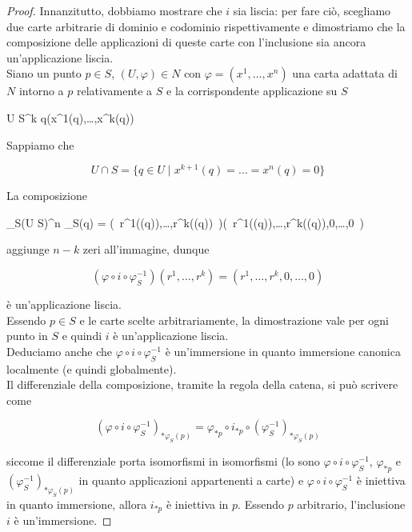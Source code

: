 \begin{proof}
	Innanzitutto, dobbiamo mostrare che $ i $ sia liscia: per fare ciò, scegliamo due carte arbitrarie di dominio e codominio rispettivamente e dimostriamo che la composizione delle applicazioni di queste carte con l'inclusione sia ancora un'applicazione liscia. \\
	Siano un punto $ p \in S $, $ (U,\varphi) \in N $ con $ \varphi = (x^{1},\dots,x^{n}) $ una carta adattata di $ N $ intorno a $ p $ relativamente a $ S $ e la corrispondente applicazione su $ S $
	
		{U \cap S}{\R^{k}}
		{q}{(x^{1}(q),\dots,x^{k}(q))}
	
	Sappiamo che
	
	\begin{equation}
		U \cap S = \{ q \in U \mid x^{k+1}(q) = \dots = x^{n}(q) = 0 \}
	\end{equation}

	La composizione
	
		{\varphi_{S}(U \cap S)}{\R^{n}}
		{\varphi_{S}(q) = (\, r^{1}(\varphi(q)),\dots,r^{k}(\varphi(q)) \,)}{(\, r^{1}(\varphi(q)),\dots,r^{k}(\varphi(q)),0,\dots,0 \,)}
	
	aggiunge $ n-k $ zeri all'immagine, dunque
	
	\begin{equation}
		(\varphi \circ i \circ \varphi_{S}^{-1}) (r^{1},\dots,r^{k}) = (r^{1},\dots,r^{k},0,\dots,0)
	\end{equation}

	è un'applicazione liscia. \\	
	Essendo $ p \in S $ e le carte scelte arbitrariamente, la dimostrazione vale per ogni punto in $ S $ e quindi $ i $ è un'applicazione liscia. \\
	Deduciamo anche che $ \varphi \circ i \circ \varphi_{S}^{-1} $ è un'immersione in quanto immersione canonica localmente (e quindi globalmente). \\
	Il differenziale della composizione, tramite la regola della catena, si può scrivere come
	
	\begin{equation}
		(\varphi \circ i \circ \varphi_{S}^{-1})_{*\varphi_{S}(p)} = \varphi_{*p} \circ i_{*p} \circ (\varphi_{S}^{-1})_{*\varphi_{S}(p)}
	\end{equation}

	siccome il differenziale porta isomorfismi in isomorfismi (lo sono $ \varphi \circ i \circ \varphi_{S}^{-1} $, $ \varphi_{*p} $ e $ (\varphi_{S}^{-1})_{*\varphi_{S}(p)} $ in quanto applicazioni appartenenti a carte) e $ \varphi \circ i \circ \varphi_{S}^{-1} $ è iniettiva in quanto immersione, allora $ i_{*p} $ è iniettiva in $ p $. Essendo $ p $ arbitrario, l'inclusione $ i $ è un'immersione.
\end{proof}

